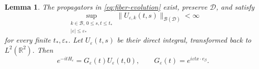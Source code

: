 \documentclass[11pt,a4paper]{article}
\newcommand{\R}{\mathbb R}
\newcommand{\B}{\mathcal B}
\newcommand{\DD}{\mathscr D}
\newcommand{\norm}[1]{\lVert #1\rVert}
\newtheorem{lemma}[lemma]{Lemma}
\numberwithin{equation}{section}
\begin{document}
\begin{lemma}\label{lem:gauge}
The propagators in \eqref{eq:fiber-evolution} exist, preserve $\DD$,
and satisfy
\begin{equation}\label{eq:propagator-graph}
 \sup_{\substack{k\in\B,\,0\leq s,t\leq t_*\\
                  |\varepsilon|\leq\varepsilon_*}}
 \norm{U_{\varepsilon,k}(t,s)}_{\mathcal B(\DD)}<\infty
\end{equation}
for every finite $t_*,\varepsilon_*$. Let
$U_\varepsilon(t,s)$ be their direct integral, transformed back to
$L^2(\R^2)$. Then
\begin{equation}\label{eq:gauge-identity}
 e^{-itH_\varepsilon}
 =G_\varepsilon(t)U_\varepsilon(t,0),\qquad
 G_\varepsilon(t)=e^{i\varepsilon t x\cdot e_\beta}.
\end{equation}
\end{lemma}
\end{document}
